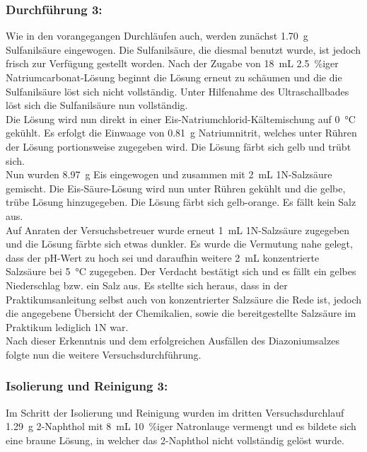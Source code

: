 \subsubsection{Durchführung 3:}
Wie in den vorangegangen Durchläufen auch, werden zunächst \SI{1,70}{\gram} Sulfanilsäure eingewogen. Die Sulfanilsäure, die diesmal benutzt wurde, ist jedoch frisch zur Verfügung gestellt worden. Nach der Zugabe von \SI{18}{\milli \liter} \SI{2,5}{\percent}iger Natriumcarbonat-Lösung beginnt die Lösung erneut zu schäumen und die die Sulfanilsäure löst sich nicht vollständig. Unter Hilfenahme des Ultraschallbades löst sich die Sulfanilsäure nun vollständig.\\
Die Lösung wird nun direkt in einer Eis-Natriumchlorid-Kältemischung auf \SI{0}{\celsius} gekühlt. Es erfolgt die Einwaage von \SI{0,81}{\gram} Natriumnitrit, welches unter Rühren der Lösung portionsweise zugegeben wird. Die Lösung färbt sich gelb und trübt sich.\\
Nun wurden \SI{8,97}{\gram} Eis eingewogen und zusammen mit \SI{2}{\milli \liter} 1N-Salzsäure gemischt. Die Eis-Säure-Lösung wird nun unter Rühren gekühlt und die gelbe, trübe Lösung hinzugegeben. Die Lösung färbt sich gelb-orange. Es fällt kein Salz aus.\\
Auf Anraten der Versuchsbetreuer wurde erneut \SI{1}{\milli \liter} 1N-Salzsäure zugegeben und die Lösung färbte sich etwas dunkler. Es wurde die Vermutung nahe gelegt, dass der pH-Wert zu hoch sei und daraufhin weitere \SI{2}{\milli \liter} konzentrierte Salzsäure bei \SI{5}{\celsius} zugegeben. Der Verdacht bestätigt sich und es fällt ein gelbes Niederschlag bzw. ein Salz aus. Es stellte sich heraus, dass in der Praktikumsanleitung selbst auch von konzentrierter Salzsäure die Rede ist, jedoch die angegebene Übersicht der Chemikalien, sowie die bereitgestellte Salzsäure im Praktikum lediglich 1N war.\\
Nach dieser Erkenntnis und dem erfolgreichen Ausfällen des Diazoniumsalzes folgte nun die weitere Versuchsdurchführung.
\subsubsection*{Isolierung und Reinigung 3:}
Im Schritt der Isolierung und Reinigung wurden im dritten Versuchsdurchlauf \SI{1,29}{\gram} 2-Naphthol mit \SI{8}{\milli \liter} \SI{10}{\percent}iger Natronlauge vermengt und es bildete sich eine braune Lösung, in welcher das 2-Naphthol nicht vollständig gelöst wurde.